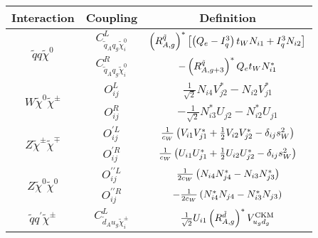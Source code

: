 \documentclass[../main.tex]{subfiles}
\begin{document}
{\renewcommand{\arraystretch}{2}
\begin{table}[ht!]
  \centering
  \begin{tabular}{|c|c|c|}
    \hline
    Interaction                                            & Coupling                                            & Definition
    \\
    \hline
    \multirow{2}{*}{\(\tilde{q} q \tilde\chi^0\)}          & \(C_{\tilde{q}_A q_g \tilde{\chi}_i^0}^{L}\)        & \(\left(R^{\tilde{q}}_{A,g}\right)^\ast \left[\left(Q_e-I^3_q\right) t_W N_{i1} + I^3_q N_{i2}\right]\)           \\
                                                           & \(C_{\tilde{q}_A q_g \tilde{\chi}_i^0}^{R}\)        & \(-\left(R^{\tilde{q}}_{A,g+3}\right)^\ast Q_e t_W N_{i1}^\ast\)                                            \\
    \hline
    \multirow{2}{*}{\(W \tilde\chi^0 \tilde\chi^\pm\)}     & \(O_{ij}^L\)                                        & \(\frac{1}{\sqrt{2}} N_{i4} V_{j2}^\ast - N_{i2}V_{j1}^\ast\)                                            \\
                                                           & \(O_{ij}^R\)                                        & \(-\frac{1}{\sqrt{2}} N_{i3}^\ast U_{j2} - N_{i2}^\ast U_{j1}\)                                          \\
    \hline
    \multirow{2}{*}{\(Z \tilde\chi^\pm \tilde\chi^\mp\)}   & \(O_{ij}^{\prime L}\)                               & \(\frac{1}{c_W} \left(V_{i1} V_{j1}^\ast + \frac{1}{2} V_{i2}V_{j2}^\ast - \delta_{ij} s_W^2\right)\)       \\
                                                           & \(O_{ij}^{\prime R}\)                               & \(\frac{1}{c_W} \left(U_{i1}U_{j1}^\ast + \frac{1}{2} U_{i2}U_{j2}^\ast - \delta_{ij} s_W^2\right)\)        \\
    \hline
    \multirow{2}{*}{\(Z \tilde\chi^0 \tilde\chi^0\)}       & \(O^{\prime\prime L}_{ij}\)                         & \(\frac{1}{2c_W} \left(N_{i4} N_{j4}^\ast - N_{i3} N_{j3}^\ast\right)\)                                     \\
                                                           & \(O^{\prime\prime R}_{ij}\)                         & \(-\frac{1}{2c_W} \left(N_{i4}^\ast N_{j4} - N_{i3}^\ast N_{j3}\right)\)                                    \\
    \hline
    \multirow{3}{*}{\(\tilde{q} q^\prime \tilde\chi^\pm\)} & \(C_{\tilde{d}_A u_g \tilde{\chi}^\pm_i}^L\)        & \(\frac{1}{\sqrt{2}} U_{i1} \left(R^{\tilde{d}}_{A,g}\right)^\ast V_{u_g d_g}^\text{CKM}\)                  \\

\end{tabular}
\end{table}}
\end{document}
